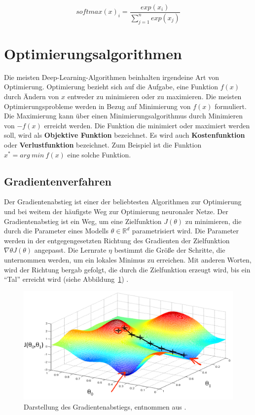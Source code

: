 \begin{equation} \label{FormelSoft}
    softmax( x)_{i} =\frac{exp( x_{i})}{\sum ^{n}_{j=1} exp( x_{j})}
\end{equation}

\section{Optimierungsalgorithmen}
Die meisten Deep-Learning-Algorithmen beinhalten irgendeine Art von Optimierung. Optimierung bezieht sich auf die Aufgabe, eine Funktion $f(x)$ durch Ändern von $x$ entweder zu minimieren oder zu maximieren. Die meisten Optimierungsprobleme werden in Bezug auf Minimierung von $f(x)$ formuliert. Die Maximierung kann über einen Minimierungsalgorithmus durch Minimieren von $-$$f(x)$ erreicht werden. Die Funktion die minimiert oder maximiert werden soll, wird als \textbf{Objektive Funktion} bezeichnet. Es wird auch \textbf{Kostenfunktion} oder \textbf{Verlustfunktion} bezeichnet. Zum Beispiel ist die Funktion $x^{*} = arg\ min\ f( x)$ eine solche Funktion.

        \subsection{Gradientenverfahren}
        Der Gradientenabstieg ist einer der beliebtesten Algorithmen zur Optimierung und bei weitem der häufigste Weg zur Optimierung neuronaler Netze. Der Gradientenabstieg ist ein Weg, um eine Zielfunktion $J(\theta)$ zu minimieren, die durch die Parameter eines Modells $\theta \in \mathbb{R}^{d}$ parametrisiert wird. Die Parameter werden in der entgegengesetzten Richtung des Gradienten der Zielfunktion $\nabla \theta J (\theta)$ angepasst. Die Lernrate $\eta$ bestimmt die Größe der Schritte, die unternommen werden, um ein lokales Minimus zu erreichen. Mit anderen Worten, wird der Richtung bergab gefolgt, die durch die Zielfunktion erzeugt wird, bis ein \enquote{Tal} erreicht wird (siehe Abbildung~\ref{Kap2:Grad}) \cite*{Ruder2016}.



        \begin{figure}[H]
            \centering
            \includegraphics[width=12cm]{kapitel2/gradient.png}
            \caption[Der Gradientenabstieg]{Darstellung des Gradientenabstiegs, entnommen aus \cite*{hackernoon}.}
            \label{Kap2:Grad}
        \end{figure}



